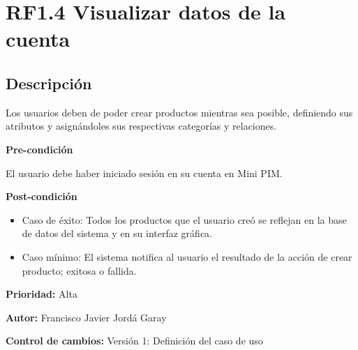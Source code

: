 \section{RF1.4 Visualizar datos de la cuenta}

\subsection*{Descripción}
Los usuarios deben de poder crear productos mientras sea posible, definiendo sus atributos y asignándoles sus respectivas categorías y relaciones.\par
\vspace{0.15cm}

\textbf{Pre-condición}\par
El usuario debe haber iniciado sesión en su cuenta en Mini PIM.\par
\vspace{0.15cm}

\textbf{Post-condición}
\begin{itemize}
    \item Caso de éxito: Todos los productos que el usuario creó se reflejan en la base de datos del sistema y en su interfaz gráfica.
    \item Caso mínimo: El sistema notifica al usuario el resultado de la acción de crear producto; exitosa o fallida.
\end{itemize}

\textbf{Prioridad: }
Alta
\vspace{0.15cm}

\textbf{Autor: }
Francisco Javier Jordá Garay\par
\vspace{0.15cm}

\textbf{Control de cambios: } Versión 1: Definición del caso de uso

